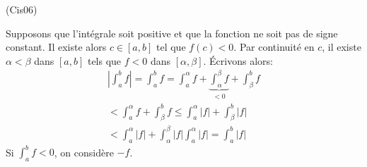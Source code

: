 \begin{tiny}(Cis06)\end{tiny} Supposons que l'intégrale soit positive et que la fonction ne soit pas de signe constant. Il existe alors $c\in [a,b]$ tel que $f(c)<0$. Par continuité en $c$, il existe $\alpha < \beta$ dans $[a,b]$ tels que $f<0$ dans $[\alpha,\beta]$. \'Ecrivons alors:
\begin{multline*}
  \left|\int_a^b f \right| = \int_a^b f =
\int_a^\alpha f  + \underset{<0}{\underbrace{\int_\alpha^\beta f}} +\int_\beta^b f \\
< \int_a^\alpha f +\int_\beta^b f
\leq \int_a^\alpha |f| +\int_\beta^b |f|\\
< \int_a^\alpha |f| +\int_\alpha^\beta |f|\int_a^\alpha |f| = \int_a^b |f|
\end{multline*}
Si $\int_a^b f <0$, on considère $-f$.